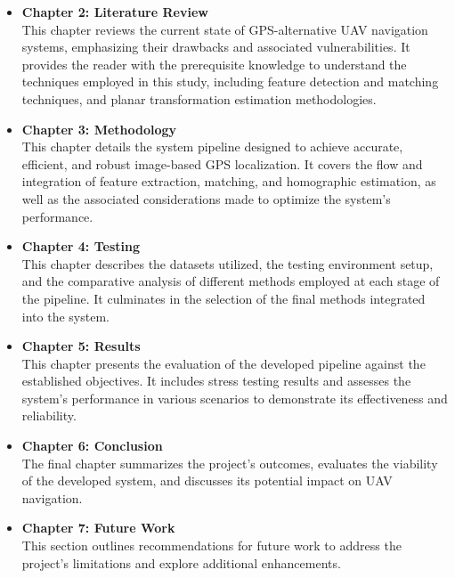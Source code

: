 \begin{itemize}
    \item \textbf{Chapter 2: Literature Review} \\
    This chapter reviews the current state of GPS-alternative UAV navigation systems, emphasizing their drawbacks and associated vulnerabilities. It provides the reader with the prerequisite knowledge to understand the techniques employed in this study, including feature detection and matching techniques, and planar transformation estimation methodologies. 
    
    \item \textbf{Chapter 3: Methodology} \\
    This chapter details the system pipeline designed to achieve accurate, efficient, and robust image-based GPS localization. It covers the flow and integration of feature extraction, matching, and homographic estimation, as well as the associated considerations made to optimize the system's performance.
    
    \item \textbf{Chapter 4: Testing} \\
    This chapter describes the datasets utilized, the testing environment setup, and the comparative analysis of different methods employed at each stage of the pipeline. It culminates in the selection of the final methods integrated into the system.
    
    \item \textbf{Chapter 5: Results} \\
    This chapter presents the evaluation of the developed pipeline against the established objectives. It includes stress testing results and assesses the system's performance in various scenarios to demonstrate its effectiveness and reliability.
    
    \item \textbf{Chapter 6: Conclusion} \\
    The final chapter summarizes the project's outcomes, evaluates the viability of the developed system, and discusses its potential impact on UAV navigation. 
    
    \item \textbf{Chapter 7: Future Work} \\
    This section outlines recommendations for future work to address the project's limitations and explore additional enhancements.
\end{itemize}

















